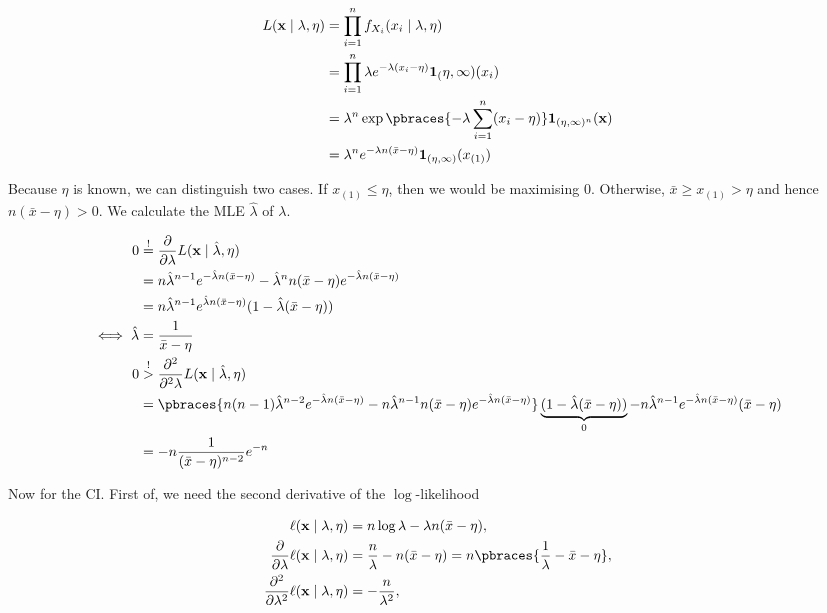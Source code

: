 \begin{solution}

\begin{align*}
    L(\mathbf x \mid \lambda, \eta)
    & =
    \prod_{i=1}^n
        f_{X_i}(x_i \mid \lambda, \eta) \\
    & =
    \prod_{i=1}^n
        \lambda
        e^{-\lambda (x_i - \eta)}
        \mathbf 1_(\eta, \infty)(x_i) \\
    & =
    \lambda^n
    \exp
    \pbraces
    {
        -\lambda
        \sum_{i=1}^n
            (x_i - \eta)
    }
    \mathbf 1_{(\eta, \infty)^n}(\mathbf x) \\
    & =
    \lambda^n
    e^{-\lambda n (\bar x - \eta)}
    \mathbf 1_{(\eta, \infty)}(x_{(1)})
\end{align*}

Because $\eta$ is known, we can distinguish two cases.
If $x_{(1)} \leq \eta$, then we would be maximising $0$.
Otherwise, $\bar x \geq x_{(1)} > \eta$ and hence $n (\bar x - \eta) > 0$.
We calculate the MLE $\hat \lambda$ of $\lambda$.

\begin{align*}
    0
    & \stackrel{!}{=}
    \frac{\partial}{\partial \lambda}
        L(\mathbf x \mid \hat \lambda, \eta) \\
    & =
    n \hat \lambda^{n-1} e^{-\hat \lambda n (\bar x - \eta)}
    -
    \hat \lambda^n n (\bar x - \eta) e^{-\hat \lambda n (\bar x - \eta)} \\
    & =
    n \hat \lambda^{n-1} e^{\hat \lambda n (\bar x - \eta)} (1 - \hat \lambda (\bar x - \eta)) \\
    \iff
    \hat \lambda & = \frac{1}{\bar x - \eta} \\
    0
    & \stackrel{!}{>}
    \frac{\partial^2}{\partial^2 \lambda}
        L(\mathbf x \mid \hat \lambda, \eta) \\
    & =
    \pbraces
    {
        n (n - 1) \hat \lambda^{n-2} e^{-\hat \lambda n (\bar x - \eta)}
        -
        n \hat \lambda^{n-1} n (\bar x - \eta) e^{-\hat \lambda n (\bar x - \eta)}
    }
    \underbrace{(1 - \hat \lambda (\bar x - \eta))}_0
    -
    n \hat \lambda^{n-1} e^{-\hat \lambda n (\bar x - \eta)} (\bar x - \eta) \\
    & =
    -n \frac{1}{(\bar x - \eta)^{n-2}} e^{-n}
\end{align*}

Now for the CI.
First of, we need the second derivative of the $\log$-likelihood

\begin{align*}
    \ell(\mathbf x \mid \lambda, \eta)
    & =
    n \log \lambda - \lambda n (\bar x - \eta), \\
    \frac{\partial}{\partial \lambda}
        \ell(\mathbf x \mid \lambda, \eta)
    & =
    \frac{n}{\lambda} - n (\bar x - \eta)
    =
    n \pbraces{\frac{1}{\lambda} - \bar x - \eta}, \\
    \frac{\partial^2}{\partial \lambda^2}
        \ell(\mathbf x \mid \lambda, \eta)
    & =
    -\frac{n}{\lambda^2},
\end{align*}


\end{solution}
